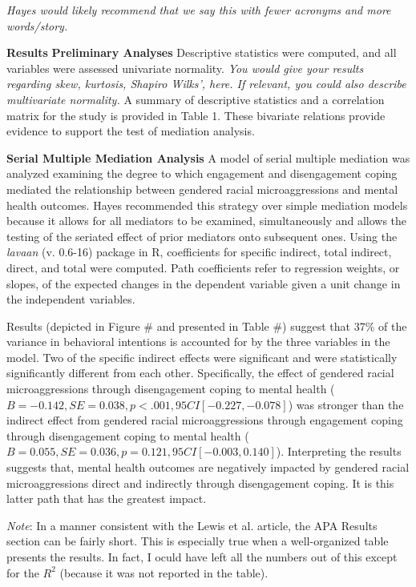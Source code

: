 \documentclass[
  11pt,
]{book}
\begin{document}
\emph{Hayes would likely recommend that we say this with fewer acronyms and more words/story.}

\textbf{Results} \textbf{Preliminary Analyses} Descriptive statistics were computed, and all variables were assessed univariate normality. \emph{You would give your results regarding skew, kurtosis, Shapiro Wilks', here. If relevant, you could also describe multivariate normality.} A summary of descriptive statistics and a correlation matrix for the study is provided in Table 1. These bivariate relations provide evidence to support the test of mediation analysis.

\textbf{Serial Multiple Mediation Analysis} A model of serial multiple mediation was analyzed examining the degree to which engagement and disengagement coping mediated the relationship between gendered racial microaggressions and mental health outcomes. Hayes \citeyearpar{hayes_more_2022} recommended this strategy over simple mediation models because it allows for all mediators to be examined, simultaneously and allows the testing of the seriated effect of prior mediators onto subsequent ones. Using the \emph{lavaan} (v. 0.6-16) package in R, coefficients for specific indirect, total indirect, direct, and total were computed. Path coefficients refer to regression weights, or slopes, of the expected changes in the dependent variable given a unit change in the independent variables.

Results (depicted in Figure \# and presented in Table \#) suggest that 37\% of the variance in behavioral intentions is accounted for by the three variables in the model. Two of the specific indirect effects were significant and were statistically significantly different from each other. Specifically, the effect of gendered racial microaggressions through disengagement coping to mental health (\(B= -0.142, SE = 0.038, p < .001, 95CI[-0.227, -0.078]\)) was stronger than the indirect effect from gendered racial microaggressions through engagement coping through disengagement coping to mental health (\(B = 0.055, SE = 0.036, p =0.121, 95CI [-0.003, 0.140]\)). Interpreting the results suggests that, mental health outcomes are negatively impacted by gendered racial microaggressions direct and indirectly through disengagement coping. It is this latter path that has the greatest impact.

\emph{Note}: In a manner consistent with the Lewis et al. \citeyearpar{lewis_applying_2017} article, the APA Results section can be fairly short. This is especially true when a well-organized table presents the results. In fact, I oculd have left all the numbers out of this except for the \(R^2\) (because it was not reported in the table).
\end{document}
